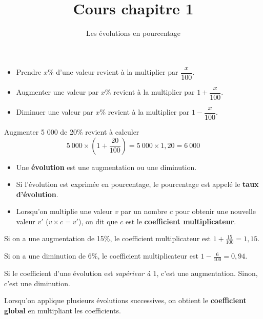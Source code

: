 \documentclass[classe=1STI2D]{coursclass}
\title{Cours chapitre 1}
\author{Les évolutions en pourcentage}
\date{}
\begin{document}
\maketitle

\begin{definition}[pourcentage]
	\begin{itemize}
		\item Prendre $x\%$ d'une valeur revient à la multiplier par $\dfrac{x}{100}$.
		\item Augmenter une valeur par $x\%$ revient à la multiplier par $1 + \dfrac{x}{100}$.
		\item Diminuer une valeur par $x\%$ revient à la multiplier par $1 - \dfrac{x}{100}$.
	\end{itemize}
\end{definition}

\begin{exemple}
	Augmenter 5 000 de 20\% revient à calculer
	$$ 5\ 000 × \left(1 + \frac{20}{100}\right) = 5\ 000 × 1,20 = 6\ 000 $$
\end{exemple}

\begin{definition}[vocabulaire]
	\begin{itemize}
		\item Une \textbf{évolution} est une augmentation ou une diminution.
		\item Si l'évolution est exprimée en pourcentage, le pourcentage est appelé le \textbf{taux d'évolution}.
		\item Lorsqu'on multiplie une valeur $v$ par un nombre $c$ pour obtenir une nouvelle valeur $v'$ ($v × c = v'$), on dit que $c$ est le \textbf{coefficient multiplicateur}.
	\end{itemize}
\end{definition}

\begin{exemple}
	Si on a une augmentation de 15\%, le coefficient multiplicateur est $1 + \frac{15}{100} = 1,15$.

	Si on a une diminution de 6\%, le coefficient multiplicateur est $1 - \frac{6}{100} = 0,94$.
\end{exemple}

\begin{greybox}[frametitle={Remarque}]
	Si le coefficient d'une évolution est \textit{supérieur à $1$}, c'est une augmentation. Sinon, c'est une diminution.
\end{greybox}

\begin{propriete}
	Lorsqu'on applique plusieurs évolutions successives, on obtient le \textbf{coefficient global} en multipliant les coefficients.
\end{propriete}
\end{document}
